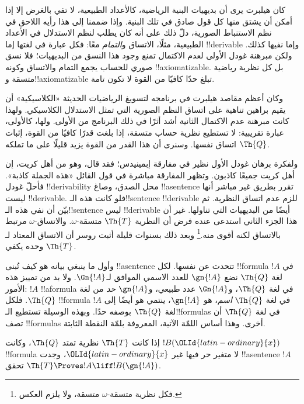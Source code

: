 \documentclass[../../../include/open-logic-section]{subfiles}
\begin{document}


كان هيلبرت يرى أن بديهيات البنية الرياضية، كالأعداد الطبيعية، لا
تفي بالغرض إلا إذا أمكن أن يشتق منها كل قول صادق في تلك البنية.
وإذا ضممنا إلى هذا رأيه اللاحق في نظم الاستنباط الصورية، دلّ ذلك
على أنه كان يطلب لنظم الاستدلال في الأعداد الطبيعية، مثلًا، الاتساق
و\emph{التمام} معًا: فكل عبارة في لغتها إما !!{derivable} وإما
نفيها كذلك. ولكن مبرهنة غودل الأولى لعدم الاكتمال تمنع وجود هذا
النسق من البديهيات؛ فلا نسق صوري للحساب يجمع التمام والاتساق وكونه
!!{axiomatizable}. بل كل نظرية رياضية متسقة و!!{axiomatizable}
تبلغ حدًا كافيًا من القوة لا تكون تامة.

وكان أعظم مقاصد هيلبرت في برنامجه لتسويغ الرياضيات الحديثة
«الكلاسيكية» أن يقيم براهين تناهية على اتساق النظم الصورية التي
تمثل الاستدلال الكلاسيكي. ولهذا كانت مبرهنة عدم الاكتمال الثانية
أشد أثرًا في ذلك البرنامج من الأولى. ولها، كالأولى، عبارة تقريبية:
لا تستطيع نظرية حساب متسقة، إذا بلغت قدرًا كافيًا من القوة، إثبات
اتساق نفسها. وسنرى أن هذا القدر من القوة يزيد قليلًا على
ما تملكه $\Th{Q}$.

ولفكرة برهان غودل الأول نظير في مفارقة إبمينيدس؛ فقد قال، وهو
من أهل كريت، إن أهل كريت جميعًا كاذبون. وتظهر المفارقة مباشرة في
قول القائل «هذه الجملة كاذبة». فأحلّ غودل !!{derivability} محل
الصدق، وصاغ !!a{sentence} تقرر بطريق غير مباشر أنها ليست
!!{derivable}. فلو كانت هذه الـ!!{sentence} !!{derivable} للزم
عدم اتساق النظرية. ثم بيّن أن نفي هذه الـ!!{sentence} ليس
!!{derivable} أيضًا من البديهيات التي تناولها. غير أن هذا الجزء
الثاني استدعى عنده فرض أن النظرية $\Th{T}$ متسقة-$\omega$.
والاتساق-$\omega$ مرتبط بالاتساق لكنه أقوى منه.\footnote{فكل نظرية
متسقة-$\omega$ متسقة، ولا يلزم العكس.} وبعد ذلك بسنوات قليلة أثبت
روسر أن الاتساق المعتاد لـ$\Th{T}$ وحده يكفي.

وأول ما ينبغي بيانه هو كيف تُبنى !!a{sentence} تتحدث عن نفسها.
لكل !!{formula} $!A$ في لغة $\Th{Q}$ نضع $\gn{!A}$ للعدد الاسمي
الموافق لـ$\Gn{!A}$. ولا بد من تمييز هذه الأمور: $!A$
!!a{formula} في لغة $\Th{Q}$، و$\Gn{!A}$ عدد طبيعي،
و$\gn{!A}$ \emph{حد} من لغة $\Th{Q}$. فلكل !!{formula} $!A$
في لغة $\Th{Q}$ \emph{اسم}، هو $\gn{!A}$، ينتمي هو أيضًا إلى
لغة $\Th{Q}$ بوصفه حدًا. وبهذه الوسيلة تستطيع الـ!!{formula}s
في لغة $\Th{Q}$ أن تصف !!{formula}s أخرى. وهذا أساس اللمّة
الآتية، المعروفة بلمّة النقطة الثابتة.

\begin{lem}
إذا كانت $\Th{T}$ نظرية تمتد $\Th{Q}$، وكانت $!B(\OLId{latin-ordinary}{x})$
!!{formula} لا متغير حر فيها غير $\OLId{latin-ordinary}{x}$، وجدت !!a{sentence} $!A$
تحقق $\Th{T}\Proves !A\liff !B(\gn{!A})$.
\end{lem}
\end{document}
